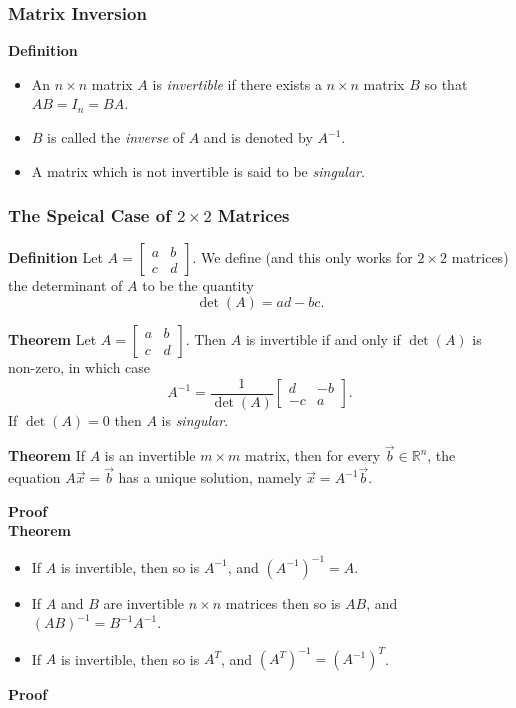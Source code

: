 \begin{frame}[fragile] \frametitle{Matrix Inversion}

\textbf{Definition}
\begin{itemize}
\item  An $n\times n$ matrix $A$ is {\em invertible} if there exists a $n\times n$ matrix $B$
so that $AB = I_n = BA$.  
\item  $B$ is called the {\em inverse} of $A$ and is denoted by $A^{-1}$.   
\item  A matrix which is not invertible is said to be {\em singular}.
\end{itemize}
\end{frame}


\begin{frame}[fragile]\frametitle{The Speical Case of $2\times 2$ Matrices}


\textbf{Definition}
 Let $A= \begin{bmatrix} a & b \\ c& d \end{bmatrix}$.  We define (and this only works for
$2\times 2$ matrices) the determinant of $A$ to be the quantity $$\det(A) = ad-bc.$$

\textbf{Theorem}
 Let $A = \begin{bmatrix} a & b \\ c& d \end{bmatrix}$.  Then $A$ is invertible if and only
if $\det(A)$ is non-zero, in which case
\[
 A^{-1} = \frac{1}{\det(A)} \left[\begin{array}{rr} d & -b \\ -c& a \end{array}\right]. 
\]
If $\det(A)=0$ then $A$ is {\em singular}.

\end{frame}

\begin{frame}[fragile]
\textbf{Theorem}
 If $A$ is an invertible $m\times m$ matrix, 
then for every $\vec{b}\in \mathbb R^n$, the equation 
$A \vec{x}=\vec{b}$ has a unique solution, 
namely $\vec{x} = A^{-1} \vec{b}$.


\textbf{Proof}
\ \\
\textbf{Theorem}
\begin{itemize}
 \item  If $A$ is invertible, then so is $A^{-1}$, and $(A^{-1})^{-1} = A$.
\item If $A$ and $B$ are invertible $n \times n$ matrices  then so is $AB$, and $(AB)^{-1} = B^{-1}A^{-1}$.
\item If $A$ is invertible, then so is $A^{T}$, and $(A^T)^{-1} = (A^{-1})^T$.
\end{itemize}


\textbf{Proof}
\ \\


\end{frame}



